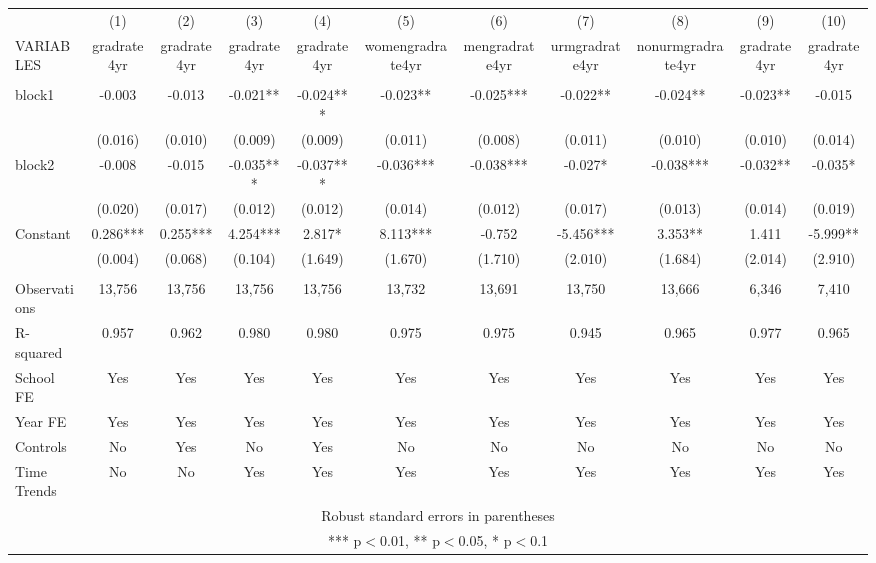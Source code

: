 \documentclass[]{article}
\begin{document}
\begin{tabular}{lcccccccccc} \hline
 & (1) & (2) & (3) & (4) & (5) & (6) & (7) & (8) & (9) & (10) \\
VARIABLES & gradrate4yr & gradrate4yr & gradrate4yr & gradrate4yr & womengradrate4yr & mengradrate4yr & urmgradrate4yr & nonurmgradrate4yr & gradrate4yr & gradrate4yr \\ \hline
 &  &  &  &  &  &  &  &  &  &  \\
block1 & -0.003 & -0.013 & -0.021** & -0.024*** & -0.023** & -0.025*** & -0.022** & -0.024** & -0.023** & -0.015 \\
 & (0.016) & (0.010) & (0.009) & (0.009) & (0.011) & (0.008) & (0.011) & (0.010) & (0.010) & (0.014) \\
block2 & -0.008 & -0.015 & -0.035*** & -0.037*** & -0.036*** & -0.038*** & -0.027* & -0.038*** & -0.032** & -0.035* \\
 & (0.020) & (0.017) & (0.012) & (0.012) & (0.014) & (0.012) & (0.017) & (0.013) & (0.014) & (0.019) \\
Constant & 0.286*** & 0.255*** & 4.254*** & 2.817* & 8.113*** & -0.752 & -5.456*** & 3.353** & 1.411 & -5.999** \\
 & (0.004) & (0.068) & (0.104) & (1.649) & (1.670) & (1.710) & (2.010) & (1.684) & (2.014) & (2.910) \\
 &  &  &  &  &  &  &  &  &  &  \\
Observations & 13,756 & 13,756 & 13,756 & 13,756 & 13,732 & 13,691 & 13,750 & 13,666 & 6,346 & 7,410 \\
R-squared & 0.957 & 0.962 & 0.980 & 0.980 & 0.975 & 0.975 & 0.945 & 0.965 & 0.977 & 0.965 \\
School FE & Yes & Yes & Yes & Yes & Yes & Yes & Yes & Yes & Yes & Yes \\
Year FE & Yes & Yes & Yes & Yes & Yes & Yes & Yes & Yes & Yes & Yes \\
Controls & No & Yes & No & Yes & No & No & No & No & No & No \\
 Time Trends & No & No & Yes & Yes & Yes & Yes & Yes & Yes & Yes & Yes \\ \hline
\multicolumn{11}{c}{ Robust standard errors in parentheses} \\
\multicolumn{11}{c}{ *** p$<$0.01, ** p$<$0.05, * p$<$0.1} \\
\end{tabular}
\end{document}
